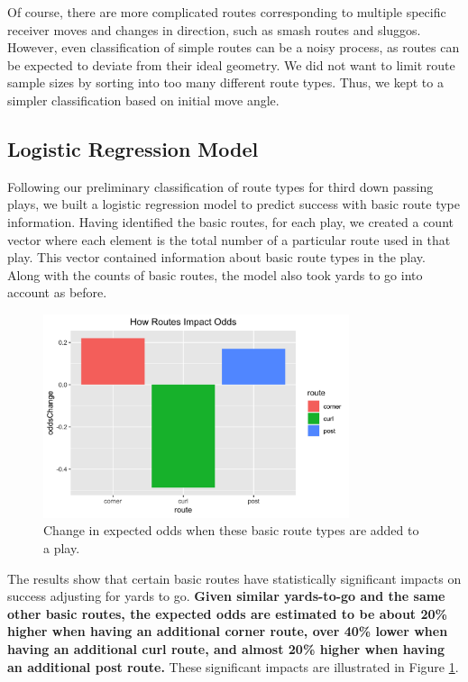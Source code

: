 \documentclass[12pt,letterpaper]{article}
\begin{document}
Of course, there are more complicated routes corresponding to multiple specific receiver moves and changes in direction, such as smash routes and sluggos. However, even classification of simple routes can be a noisy process, as routes can be expected to deviate from their ideal geometry. We did not want to limit route sample sizes by sorting into too many different route types. Thus, we kept to a simpler classification based on initial move angle.

\subsection*{Logistic Regression Model}

Following our preliminary classification of route types for third down passing plays, we built a logistic regression model to predict success with basic route type information. Having identified the basic routes, for each play, we created a count vector where each element is the total number of a particular route used in that play. This vector contained information about basic route types in the play. Along with the counts of basic routes, the model also took yards to go into account as before. 

\begin{figure}[h!]
\centering
\includegraphics[width=0.8\textwidth]{odds_routes.png}
\caption{Change in expected odds when these basic route types are added to a play.}
\label{fig:route_odds}
\end{figure}

The results show that certain basic routes have statistically significant impacts on success adjusting for yards to go. \textbf{Given similar yards-to-go and the same other basic routes, the expected odds are estimated to be about 20\% higher when having an additional corner route, over 40\% lower when having an additional curl route, and almost 20\% higher when having an additional post route.} These significant impacts are illustrated in Figure \ref{fig:route_odds}.
\end{document}
